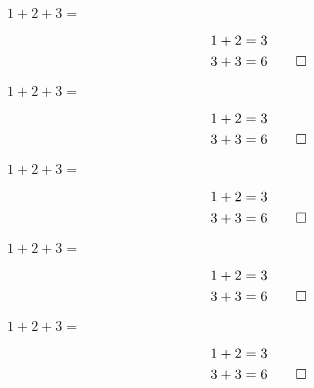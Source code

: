 \documentclass{exam-zh}
\begin{document}
\begin{choices}[label = {}]
  \item
    \begin{minipage}{0.4\textwidth}
      $ 1 + 2 + 3 = $ 
      \begin{solution}[blank-type = none]
        \begin{align*}
          1 + 2 &= 3\\
          3 + 3 &= 6 \qedhere
        \end{align*}
      \end{solution}
    \end{minipage}
  \item
    \begin{minipage}{0.4\textwidth}
      $ 1 + 2 + 3 = $ 
      \begin{solution}[blank-type = none]
        \begin{align*}
          1 + 2 &= 3\\
          3 + 3 &= 6 \qedhere
        \end{align*}
      \end{solution}
    \end{minipage}
\end{choices}

\begin{choices}[label = {}]
  \item
    \begin{minipage}{8em}
      $ 1 + 2 + 3 = $ 
      \begin{solution}[blank-type = none]
        \begin{align*}
          1 + 2 &= 3\\
          3 + 3 &= 6 \qedhere
        \end{align*}
      \end{solution}
    \end{minipage}
  \item
    \begin{minipage}{8em}
      $ 1 + 2 + 3 = $ 
      \begin{solution}[blank-type = none]
        \begin{align*}
          1 + 2 &= 3\\
          3 + 3 &= 6 \qedhere
        \end{align*}
      \end{solution}
    \end{minipage}
  \item
    \begin{minipage}{8em}
      $ 1 + 2 + 3 = $ 
      \begin{solution}[blank-type = none]
        \begin{align*}
          1 + 2 &= 3\\
          3 + 3 &= 6 \qedhere
        \end{align*}
      \end{solution}
    \end{minipage}
\end{choices}
\end{document}
